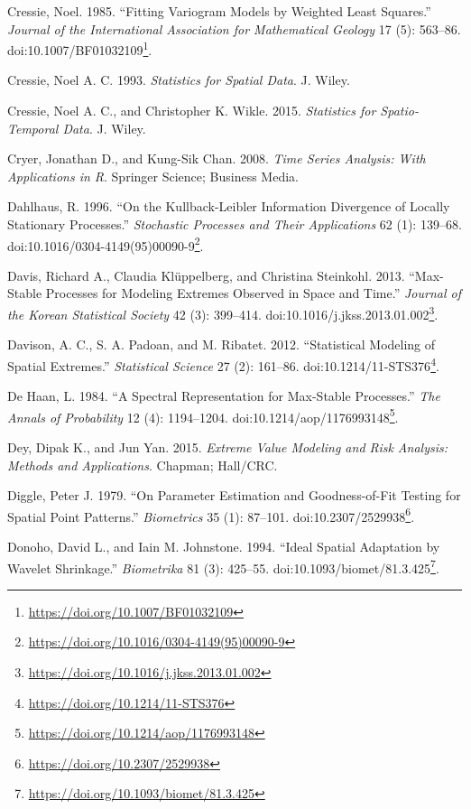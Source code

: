 \documentclass[b5paper,]{book}
\let\rmarkdownfootnote\footnote%
\def\footnote{\protect\rmarkdownfootnote}
\renewcommand{\href}[2]{#2\footnote{\url{#1}}}
\theoremstyle{definition}
\theoremstyle{definition}
\theoremstyle{definition}
\theoremstyle{remark}
\begin{document}
\hypertarget{ref-Cressie1985}{}
Cressie, Noel. 1985. ``Fitting Variogram Models by Weighted Least
Squares.'' \emph{Journal of the International Association for
Mathematical Geology} 17 (5): 563--86.
doi:\href{https://doi.org/10.1007/BF01032109}{10.1007/BF01032109}.

\hypertarget{ref-Cressie1993}{}
Cressie, Noel A. C. 1993. \emph{Statistics for Spatial Data}. J. Wiley.

\hypertarget{ref-Cressie2015}{}
Cressie, Noel A. C., and Christopher K. Wikle. 2015. \emph{Statistics
for Spatio-Temporal Data}. J. Wiley.

\hypertarget{ref-Cryer2008}{}
Cryer, Jonathan D., and Kung-Sik Chan. 2008. \emph{Time Series Analysis:
With Applications in R}. Springer Science; Business Media.

\hypertarget{ref-Dahlhaus1996}{}
Dahlhaus, R. 1996. ``On the Kullback-Leibler Information Divergence of
Locally Stationary Processes.'' \emph{Stochastic Processes and Their
Applications} 62 (1): 139--68.
doi:\href{https://doi.org/10.1016/0304-4149(95)00090-9}{10.1016/0304-4149(95)00090-9}.

\hypertarget{ref-Davis2013}{}
Davis, Richard A., Claudia Klüppelberg, and Christina Steinkohl. 2013.
``Max-Stable Processes for Modeling Extremes Observed in Space and
Time.'' \emph{Journal of the Korean Statistical Society} 42 (3):
399--414.
doi:\href{https://doi.org/10.1016/j.jkss.2013.01.002}{10.1016/j.jkss.2013.01.002}.

\hypertarget{ref-Davison2012}{}
Davison, A. C., S. A. Padoan, and M. Ribatet. 2012. ``Statistical
Modeling of Spatial Extremes.'' \emph{Statistical Science} 27 (2):
161--86.
doi:\href{https://doi.org/10.1214/11-STS376}{10.1214/11-STS376}.

\hypertarget{ref-DeHaan1984}{}
De Haan, L. 1984. ``A Spectral Representation for Max-Stable
Processes.'' \emph{The Annals of Probability} 12 (4): 1194--1204.
doi:\href{https://doi.org/10.1214/aop/1176993148}{10.1214/aop/1176993148}.

\hypertarget{ref-Dey2015}{}
Dey, Dipak K., and Jun Yan. 2015. \emph{Extreme Value Modeling and Risk
Analysis: Methods and Applications}. Chapman; Hall/CRC.

\hypertarget{ref-Diggle1979}{}
Diggle, Peter J. 1979. ``On Parameter Estimation and Goodness-of-Fit
Testing for Spatial Point Patterns.'' \emph{Biometrics} 35 (1): 87--101.
doi:\href{https://doi.org/10.2307/2529938}{10.2307/2529938}.

\hypertarget{ref-Donoho1994}{}
Donoho, David L., and Iain M. Johnstone. 1994. ``Ideal Spatial
Adaptation by Wavelet Shrinkage.'' \emph{Biometrika} 81 (3): 425--55.
doi:\href{https://doi.org/10.1093/biomet/81.3.425}{10.1093/biomet/81.3.425}.
\end{document}
